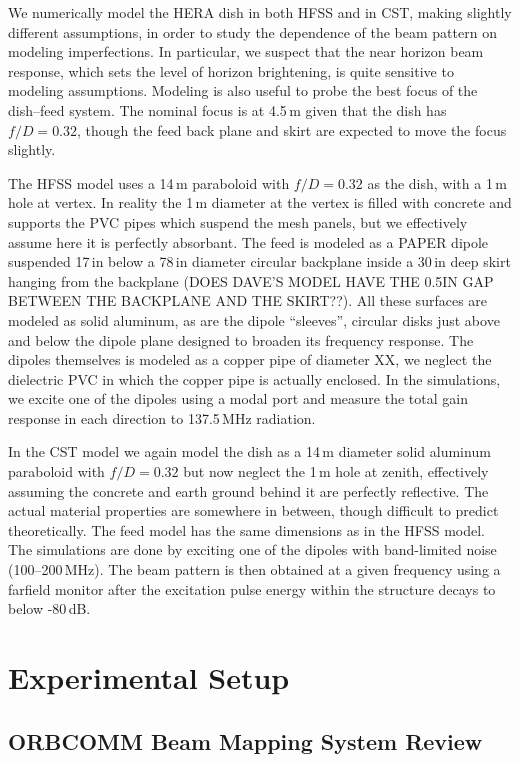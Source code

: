 \documentclass{emulateapj}
\begin{document}
We numerically model the HERA dish in both HFSS and in CST, making slightly different assumptions, in order to study the dependence of the beam pattern on modeling imperfections. In particular, we suspect that the near horizon beam response, which sets the level of horizon brightening, is quite sensitive to modeling assumptions. Modeling is also useful to probe the best focus of the dish--feed system. The nominal focus is at 4.5\,m given that the dish has $f/D=0.32$, though the feed back plane and skirt are expected to move the focus slightly.

The HFSS model uses a 14\,m paraboloid with $f/D=0.32$ as the dish, with a 1\,m hole at vertex. In reality the 1\,m diameter at the vertex is filled with concrete and supports the PVC pipes which suspend the mesh panels, but we effectively assume here it is perfectly absorbant.  The feed is modeled as a PAPER dipole suspended 17\,in below a 78\,in diameter circular backplane inside a 30\,in deep skirt hanging from the backplane (DOES DAVE'S MODEL HAVE THE 0.5IN GAP BETWEEN THE BACKPLANE AND THE SKIRT??). All these surfaces are modeled as solid aluminum, as are the dipole ``sleeves'', circular disks just above and below the dipole plane designed to broaden its frequency response. The dipoles themselves is modeled as a copper pipe of diameter XX, we neglect the dielectric PVC in which the copper pipe is actually enclosed. In the simulations, we excite one of the dipoles using a modal port and measure the total gain response in each direction to 137.5\,MHz radiation.

In the CST model we again model the dish as a 14\,m diameter solid aluminum paraboloid with $f/D=0.32$ but now neglect the 1\,m hole at zenith, effectively assuming the concrete and earth ground behind it are perfectly reflective. The actual material properties are somewhere in between, though difficult to predict theoretically. The feed model has the same dimensions as in the HFSS model. The simulations are done by exciting one of the dipoles with band-limited noise (100--200\,MHz). The beam pattern is then obtained at a given frequency using a farfield monitor after the excitation pulse energy within the structure decays to below -80\,dB.

\section{Experimental Setup}

\subsection{ORBCOMM Beam Mapping System Review}
\end{document}
